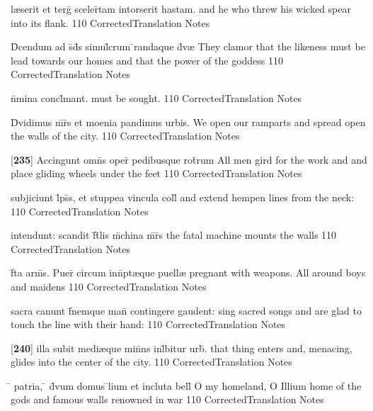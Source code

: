 \latline
  {l{\ae}serit et terg\={} sceler\={}tam intorserit hastam.}
  { and he who threw his wicked spear into its flank. }
  {110}
  { CorrectedTranslation }
  { Notes }


\latline
  {D\={}cendum ad s\={}d\={}s simul\={}crum \={}randaque d\={\macron {\i}}v{\ae}}
  { They clamor that the likeness must be lead towards our homes and that the power of the goddess  }
  {110}
  { CorrectedTranslation }
  { Notes }


\latline
  {n\={}mina concl\={}mant.}
  { must be sought. }
  {110}
  { CorrectedTranslation }
  { Notes }


\latline
  {D\={\macron {\i}}vidimus m\={}r\={}s et moenia pandimus urbis.}
  { We open our ramparts and spread open the walls of the city. }
  {110}
  { CorrectedTranslation }
  { Notes }


\latline
  {[\textbf{235}] Accingunt omn\={}s oper\={\macron {\i}} pedibusque rot\={}rum}
  { All men gird for the work and and place gliding wheels under the feet  }
  {110}
  { CorrectedTranslation }
  { Notes }


\latline
  {subjiciunt l\={}ps\={}s, et stuppea vincula coll\={}}
  { and extend hempen lines from the neck: }
  {110}
  { CorrectedTranslation }
  { Notes }


\latline
  {intendunt: scandit f\={}t\={}lis m\={}china m\={}r\={}s}
  { the fatal machine mounts the walls  }
  {110}
  { CorrectedTranslation }
  { Notes }


\latline
  {f\={}ta arm\={\macron {\i}}s.  Puer\={\macron {\i}} circum inn\={}pt{\ae}que puell{\ae}}
  { pregnant with weapons.  All around boys and maidens }
  {110}
  { CorrectedTranslation }
  { Notes }


\latline
  {sacra canunt f\={}nemque man\={} contingere gaudent:}
  { sing sacred songs and are glad to touch the line with their hand: }
  {110}
  { CorrectedTranslation }
  { Notes }


\latline
  {[\textbf{240}] illa subit medi{\ae}que min\={}ns inl\={}bitur urb\={\macron {\i}}.}
  { that thing enters and, menacing, glides into the center of the city. }
  {110}
  { CorrectedTranslation }
  { Notes }


\latline
  {\={} patria, \={} d\={\macron {\i}}vum domus \={}lium et incluta bell\={}}
  { O my homeland, O Illium home of the gods and famous walls renowned in war }
  {110}
  { CorrectedTranslation }
  { Notes }


